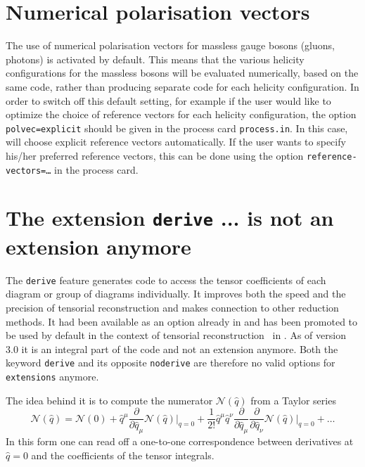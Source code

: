 \section{Numerical polarisation vectors}
\label{sec:numpolvec}
The use of numerical polarisation vectors for massless gauge bosons
(gluons, photons) is activated by default.  This means that the
various helicity configurations for the massless bosons will be
evaluated numerically, based on the same code, rather than producing
separate code for each helicity configuration.  In order to switch off
this default setting,
for example if the user would like to 
optimize the choice of reference vectors for each helicity configuration,
the option \texttt{polvec=explicit} should be given in the process card 
\texttt{process.in}.
In this case, \gosam{} will choose explicit reference vectors automatically.
If the user wants to specify his/her preferred reference vectors, 
this can be done using the option \texttt{reference-vectors=\ldots}
in the process card.

\section{The extension \texttt{derive} ... is not an extension anymore}
\label{sec:derive}

The \texttt{derive} feature generates code to access the tensor coefficients
of each diagram or group of diagrams individually. It improves both the speed and the precision of tensorial reconstruction and makes connection to other reduction methods. It had been available as an option already in  and has been promoted to be used by default in the context of  tensorial reconstruction~\cite{Heinrich:2010ax} in . As of version 3.0 it is an integral part of the code and not an extension anymore. Both the keyword \texttt{derive} and its opposite \texttt{noderive} are therefore no valid options for \texttt{extensions} anymore.

The idea behind it is to compute the numerator $\mathcal{N}(\hat{q})$ 
from a Taylor series
\begin{equation}
\mathcal{N}(\hat{q})=\mathcal{N}(0)
+ \hat{q}^\mu
  \frac{\partial}{\partial\hat{q}_\mu}\mathcal{N}(\hat{q})\vert_{q=0}
+ \frac1{2!}\hat{q}^\mu\hat{q}^\nu
  \frac{\partial}{\partial\hat{q}_\mu}
  \frac{\partial}{\partial\hat{q}_\nu}
  \mathcal{N}(\hat{q})\vert_{q=0} + \ldots
\end{equation}
In this form one can read off a one-to-one correspondence between derivatives at
$\hat{q}=0$ and the coefficients of the tensor integrals.

